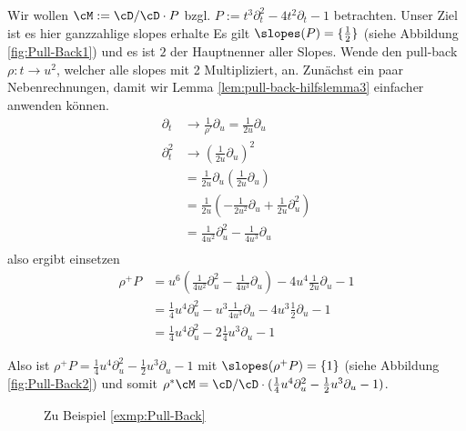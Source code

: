 \begin{exmp}
Wir wollen $\cM:=\cD/\cD\cdot P$ bzgl. $P:= t^3\partial_t^2-4t^2\partial_t-1$
betrachten.
Unser Ziel ist es hier ganzzahlige slopes erhalte
Es gilt $ \slopes(P)=\{\frac{1}{2}\} $ (siehe Abbildung \ref{fig:Pull-Back1})
und es ist $2$ der Hauptnenner aller Slopes.
Wende den pull-back
$\rho:t\rightarrow u^2$, welcher alle slopes mit 2 Multipliziert,
an.
Zunächst ein paar Nebenrechnungen, damit wir Lemma
\ref{lem:pull-back-hilfslemma3} einfacher anwenden können.
\begin{align*}
\partial_t   &\rightarrow \frac{1}{\rho'}\partial_u=\frac{1}{2u}\partial_u \\
\partial_t^2 &\rightarrow (\frac{1}{2u}\partial_u)^2 \\
             &= \frac{1}{2u}\partial_u (\frac{1}{2u}\partial_u) \\
             &= \frac{1}{2u}(-\frac{1}{2u^2}\partial_u +
               \frac{1}{2u}\partial_u^2) \\
             &= \frac{1}{4u^2}\partial_u^2-\frac{1}{4u^3}\partial_u \\
\end{align*}
also ergibt einsetzen
\begin{align*}
\rho^+P &= u^6(\frac{1}{4u^2}\partial_u^2-\frac{1}{4u^3}\partial_u)-
          4u^{4}\frac{1}{2u}\partial_u-1\\
        &= \frac{1}{4}u^4\partial_u^2-u^3\frac{1}{4u^3}\partial_u-
          4u^{3}\frac{1}{2}\partial_u-1\\
        &= \frac{1}{4}u^4\partial_u^2 -2\frac{1}{4}u^3\partial_u-1
\end{align*}

Also ist $\rho^+P= \frac{1}{4}u^4\partial_u^2 -\frac{1}{2}u^3\partial_u-1$ mit
$ \slopes(\rho^+P)=\{1\} $ (siehe Abbildung \ref{fig:Pull-Back2}) und somit
$\rho^*\cM=\cD/\cD\cdot (\frac{1}{4}u^4\partial_u^2
-\frac{1}{2}u^3\partial_u-1)$.
\begin{figure}[H]
\label{fig:Pull-Back}
\caption{Zu Beispiel \ref{exmp:Pull-Back}}
\begin{center}
\end{center}
\end{figure}
\end{exmp}

